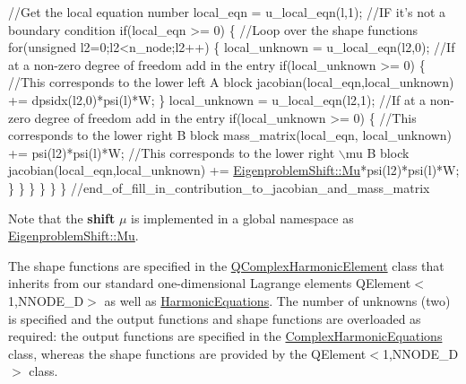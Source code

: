 \begin{DoxyCodeInclude}
       \textcolor{comment}{//Get the local equation number}
       local\_eqn = u\_local\_eqn(l,1);
       \textcolor{comment}{//IF it's not a boundary condition}
       \textcolor{keywordflow}{if}(local\_eqn >= 0)
        \{
         \textcolor{comment}{//Loop over the shape functions}
         \textcolor{keywordflow}{for}(\textcolor{keywordtype}{unsigned} l2=0;l2<n\_node;l2++)
          \{ 
           local\_unknown = u\_local\_eqn(l2,0);
           \textcolor{comment}{//If at a non-zero degree of freedom add in the entry}
           \textcolor{keywordflow}{if}(local\_unknown >= 0)
            \{
             \textcolor{comment}{//This corresponds to the lower left A block}
             jacobian(local\_eqn,local\_unknown) += dpsidx(l2,0)*psi(l)*W;
            \}
           local\_unknown = u\_local\_eqn(l2,1);
           \textcolor{comment}{//If at a non-zero degree of freedom add in the entry}
           \textcolor{keywordflow}{if}(local\_unknown >= 0)
            \{
             \textcolor{comment}{//This corresponds to the lower right B block}
             mass\_matrix(local\_eqn, local\_unknown) += psi(l2)*psi(l)*W;
             \textcolor{comment}{//This corresponds to the lower right \(\backslash\)mu B block}
             jacobian(local\_eqn,local\_unknown) += 
              \hyperlink{namespaceEigenproblemShift_a82e816b5ecba937123c65c5bd953a2fb}{EigenproblemShift::Mu}*psi(l2)*psi(l)*W;
            \}
          \}
        \}
      \}
    \}
 \} \textcolor{comment}{//end\_of\_fill\_in\_contribution\_to\_jacobian\_and\_mass\_matrix}

\end{DoxyCodeInclude}


Note that the {\bfseries shift} $\mu$ is implemented in a global namespace as {\ttfamily \hyperlink{namespaceEigenproblemShift_a82e816b5ecba937123c65c5bd953a2fb}{Eigenproblem\+Shift\+::\+Mu}}.

The shape functions are specified in the {\ttfamily \hyperlink{classQComplexHarmonicElement}{Q\+Complex\+Harmonic\+Element}} class that inherits from our standard one-\/dimensional Lagrange elements {\ttfamily Q\+Element$<$1,\+N\+N\+O\+D\+E\+\_\+D$>$} as well as {\ttfamily \hyperlink{classHarmonicEquations}{Harmonic\+Equations}}. The number of unknowns (two) is specified and the output functions and shape functions are overloaded as required\+: the output functions are specified in the {\ttfamily \hyperlink{classComplexHarmonicEquations}{Complex\+Harmonic\+Equations}} class, whereas the shape functions are provided by the {\ttfamily Q\+Element$<$1,\+N\+N\+O\+D\+E\+\_\+D$>$} class.


